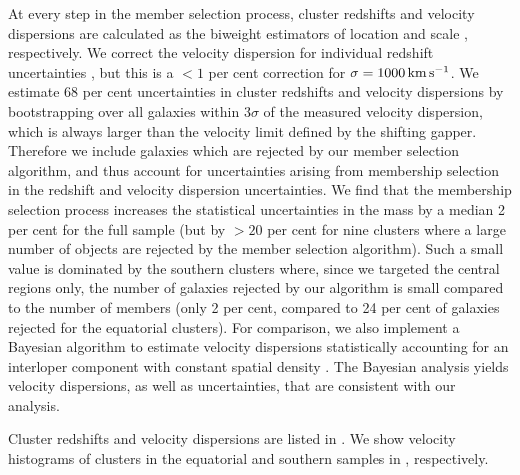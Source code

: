 At every step in the member selection process, cluster redshifts and velocity dispersions are calculated as the biweight estimators of location and scale \citep[i.e., the central value and dispersion, respectively, see equations 5 and 9 of][]{beers90}, respectively. We correct the velocity  dispersion for individual redshift uncertainties \citep{danese80}, but this is a $<1$ per cent correction for $\sigma=1000\,\mathrm{km\,s^{-1}}$. We estimate 68 per cent uncertainties in cluster redshifts and velocity dispersions by bootstrapping over all galaxies within $3\sigma$ of the measured velocity dispersion, which is always larger than the velocity limit defined by the shifting gapper. Therefore we include galaxies which are rejected by our member selection algorithm, and thus account for uncertainties arising from membership selection in the redshift and velocity dispersion uncertainties. We find that the membership selection process increases the statistical uncertainties in the mass by a median 2 per cent for the full sample (but by $>20$ per cent for nine clusters where a large number of objects are rejected by the member selection algorithm). Such a small value is dominated by the southern clusters where, since we targeted the central regions only, the number of galaxies rejected by our algorithm is small compared to the number of members (only 2 per cent, compared to 24 per cent of galaxies rejected for the equatorial clusters). For comparison, we also implement a Bayesian algorithm to estimate velocity dispersions statistically accounting for an interloper component with constant spatial density \citep{wojtak07,andreon08}. The Bayesian analysis yields velocity dispersions, as well as uncertainties, that are consistent with our analysis.

Cluster redshifts and velocity dispersions are listed in . We show velocity histograms of clusters in the equatorial and southern samples in , respectively.


